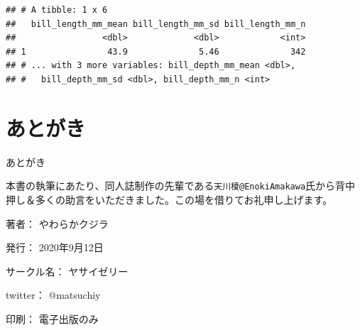 \documentclass[
  xelatex,ja=standard, b5paper]{bxjsbook}
\begin{document}
\begin{verbatim}
## # A tibble: 1 x 6
##   bill_length_mm_mean bill_length_mm_sd bill_length_mm_n
##                 <dbl>             <dbl>            <int>
## 1                43.9              5.46              342
## # ... with 3 more variables: bill_depth_mm_mean <dbl>,
## #   bill_depth_mm_sd <dbl>, bill_depth_mm_n <int>
\end{verbatim}

\hypertarget{ux3042ux3068ux304cux304d}{%
\chapter*{あとがき}\label{ux3042ux3068ux304cux304d}}

あとがき

本書の執筆にあたり、同人誌制作の先輩である\texttt{天川榎@EnokiAmakawa}氏から背中押し＆多くの助言をいただきました。この場を借りてお礼申し上げます。

\clearpage
{}
\begin{flushright}
\begin{minipage}{0.5\hsize}
\begin{description}
  \item{著者：} やわらかクジラ
  \item{発行：} 2020年9月12日
  \item{サークル名：} ヤサイゼリー
  \item{twitter：} @matsuchiy
  \item{印刷：} 電子出版のみ
\end{description}
\end{minipage}
\end{flushright}
\clearpage
\end{document}
